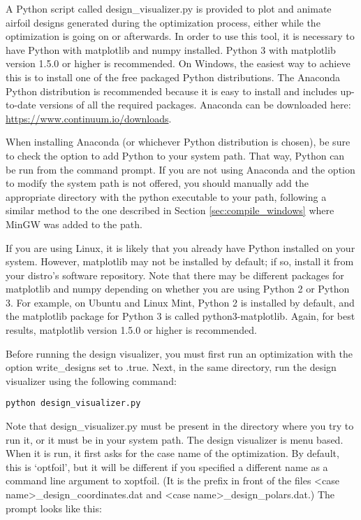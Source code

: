 \documentclass[11pt]{article}
\begin{document}
A Python script called design\_visualizer.py is provided to plot and animate airfoil
designs generated during the optimization process, either while the optimization is going
on or afterwards.  In order to use this tool, it is
necessary to have Python with matplotlib and numpy installed.  Python 3 with matplotlib
version 1.5.0 or higher is recommended.  On Windows, the easiest
way to achieve this is to install one of the free packaged Python distributions.  The
Anaconda Python distribution is recommended because it is easy to install and includes
up-to-date versions of all the required packages.  Anaconda can be downloaded here:
\url{https://www.continuum.io/downloads}.

When installing Anaconda (or whichever Python distribution is chosen), be sure to check
the option to add Python to your system path.  That way, Python can be run from the
command prompt.  If you are not using Anaconda and the option to modify the system path is
not offered, you should manually add the appropriate directory with the python executable
to your path, following a similar method to the one described in Section
\ref{sec:compile_windows} where MinGW was added to the path.

If you are using Linux, it is likely that you already have Python installed on your
system.  However, matplotlib may not be installed by default; if so, install it from your
distro's software repository.  Note that there may be different packages for matplotlib
and numpy depending on whether you are using Python 2 or Python 3. 
For example, on Ubuntu and Linux Mint, Python 2 is installed by default, and the
matplotlib package for Python 3 is called python3-matplotlib.   Again, for best results,
matplotlib version 1.5.0 or higher is recommended.

Before running the design visualizer, you must first run an optimization with the option
write\_designs set to .true. Next, in the same directory, run the design visualizer using
the following command:

\begin{verbatim}
python design_visualizer.py
\end{verbatim}

Note that design\_visualizer.py must be present in the directory where you try to run it,
or it must be in your system path.  The design visualizer is menu based.  When it is run, 
it first asks for the case name of the optimization.  By default, this is `optfoil', but
it will be different if you specified a different name as a command line argument to
xoptfoil. (It is the prefix in front of the files 
\textless case name\textgreater\_design\_coordinates.dat and
\textless case name\textgreater\_design\_polars.dat.)  The prompt looks like this:
\end{document}

